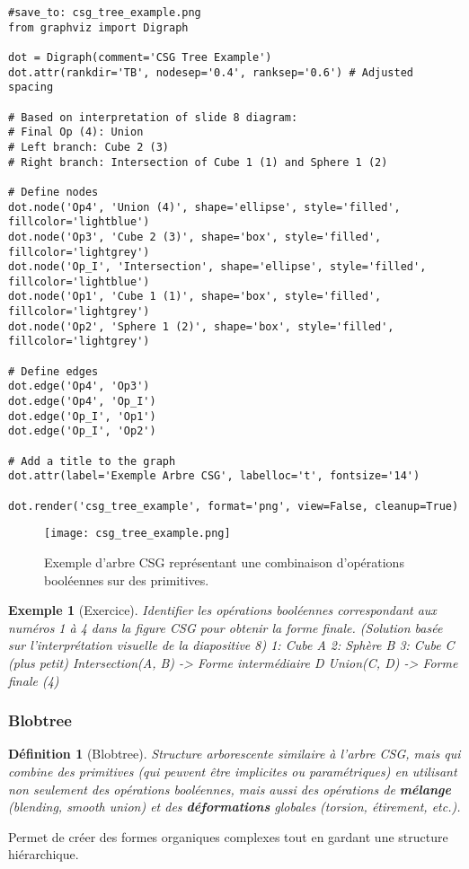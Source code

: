 \documentclass{article}
\newtheorem{definition}{Définition}
\newtheorem{example}{Exemple}
\begin{document}
\begin{verbatim}
#save_to: csg_tree_example.png
from graphviz import Digraph

dot = Digraph(comment='CSG Tree Example')
dot.attr(rankdir='TB', nodesep='0.4', ranksep='0.6') # Adjusted spacing

# Based on interpretation of slide 8 diagram:
# Final Op (4): Union
# Left branch: Cube 2 (3)
# Right branch: Intersection of Cube 1 (1) and Sphere 1 (2)

# Define nodes
dot.node('Op4', 'Union (4)', shape='ellipse', style='filled', fillcolor='lightblue')
dot.node('Op3', 'Cube 2 (3)', shape='box', style='filled', fillcolor='lightgrey')
dot.node('Op_I', 'Intersection', shape='ellipse', style='filled', fillcolor='lightblue')
dot.node('Op1', 'Cube 1 (1)', shape='box', style='filled', fillcolor='lightgrey')
dot.node('Op2', 'Sphere 1 (2)', shape='box', style='filled', fillcolor='lightgrey')

# Define edges
dot.edge('Op4', 'Op3')
dot.edge('Op4', 'Op_I')
dot.edge('Op_I', 'Op1')
dot.edge('Op_I', 'Op2')

# Add a title to the graph
dot.attr(label='Exemple Arbre CSG', labelloc='t', fontsize='14')

dot.render('csg_tree_example', format='png', view=False, cleanup=True)
\end{verbatim}

\begin{figure}[H]
\centering
\texttt{[image: csg\_tree\_example.png]} %
\caption{Exemple d'arbre CSG représentant une combinaison d'opérations booléennes sur des primitives.}
\label{fig:csg_tree}
\end{figure}

\begin{example}[Exercice]
Identifier les opérations booléennes correspondant aux numéros 1 à 4 dans la figure CSG pour obtenir la forme finale.
\textit{(Solution basée sur l'interprétation visuelle de la diapositive 8)}
1: Cube A
2: Sphère B
3: Cube C (plus petit)
Intersection(A, B) -> Forme intermédiaire D
Union(C, D) -> Forme finale (4)
\end{example}


\subsubsection{Blobtree}
\begin{definition}[Blobtree]
Structure arborescente similaire à l'arbre CSG, mais qui combine des primitives (qui peuvent être implicites ou paramétriques) en utilisant non seulement des opérations booléennes, mais aussi des opérations de \textbf{mélange} (blending, smooth union) et des \textbf{déformations} globales (torsion, étirement, etc.).
\end{definition}
Permet de créer des formes organiques complexes tout en gardant une structure hiérarchique.
\end{document}
